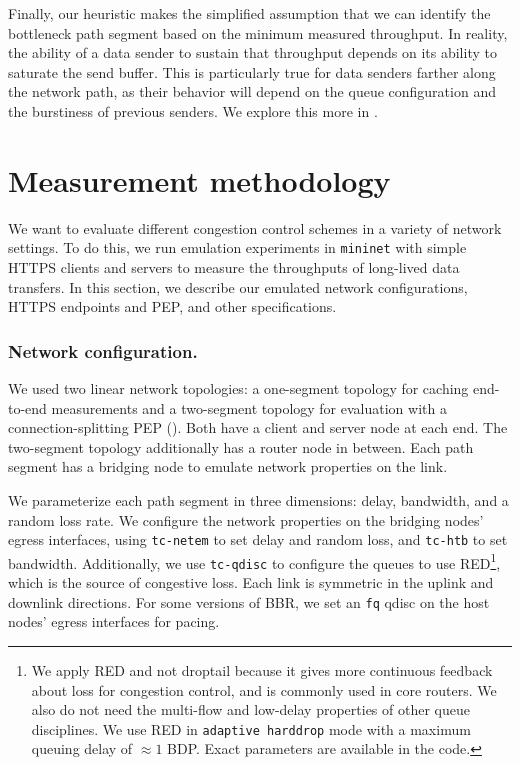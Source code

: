 Finally, our heuristic makes the simplified assumption that we can identify the
bottleneck path segment based on the minimum measured throughput. In reality,
the ability of a data sender to sustain that throughput depends on its ability
to saturate the send buffer. This is particularly true for data senders farther
along the network path, as their behavior will depend on the queue
configuration and the burstiness of previous senders. We explore this more
in .

\section{Measurement methodology}
\label{sec:splitting:methodology}




We want to evaluate different congestion control schemes in a variety of network
settings. To do this, we run emulation experiments in \texttt{mininet} with
simple HTTPS clients and servers to measure the throughputs of long-lived data
transfers. In this section,
we describe our emulated network configurations, HTTPS endpoints and
PEP, and other specifications.

\subsubsection{Network configuration.}

We used two linear network topologies: a one-segment topology for caching
end-to-end measurements and a two-segment topology for evaluation with a
connection-splitting PEP (). Both have
a client and server node at each end. The two-segment topology additionally has
a router node in between. Each path segment has a bridging node to emulate network
properties on the link.

We parameterize each path segment in three dimensions: delay, bandwidth, and a
random loss rate. We configure the network properties on the bridging nodes'
egress interfaces, using \texttt{tc-netem} to set delay and random loss,
and \texttt{tc-htb} to set bandwidth. Additionally, we use \texttt{tc-qdisc} to
configure the queues to use RED\footnote{We apply RED and not droptail because it gives more
continuous feedback about loss for congestion control, and is commonly used in
core routers. We also do not need the multi-flow and low-delay properties of
other queue disciplines. We use RED in \texttt{adaptive harddrop} mode with a
maximum queuing delay of $\approx1$ BDP. Exact parameters are available in the code.},
which is the source of congestive loss.
Each link is symmetric in
the uplink and downlink directions. For some versions of BBR, we set an \texttt
{fq} qdisc on the host nodes' egress interfaces for pacing.


